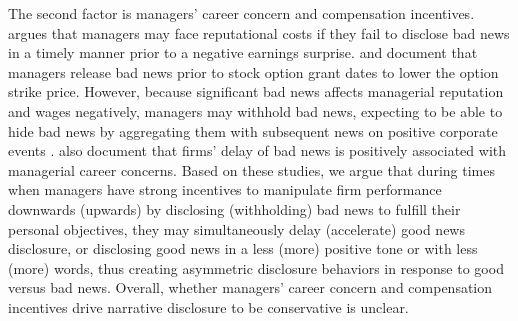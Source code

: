 \documentclass[letterpaper,11pt]{article}
\begin{document}
\begin{spacing}{1.5}
The second factor is managers' career concern and compensation incentives.  argues that managers may face reputational costs if they fail to disclose bad news in a timely manner prior to a negative earnings surprise.  and  document that managers release bad news prior to stock option grant dates to lower the option strike price. However, because significant bad news affects managerial reputation and wages negatively, managers may withhold bad news, expecting to be able to hide bad news by aggregating them with subsequent news on positive corporate events \cite{segalAreManagersStrategic2016, chapmanInformationOverloadDisclosure2019}.  also document that firms' delay of bad news is positively associated with managerial career concerns. Based on these studies, we argue that during times when managers have strong incentives to manipulate firm performance downwards (upwards) by disclosing (withholding) bad news to fulfill their personal objectives, they may simultaneously delay (accelerate) good news disclosure, or disclosing good news in a less (more) positive tone or with less (more) words, thus creating asymmetric disclosure behaviors in response to good versus bad news. Overall, whether managers' career concern and compensation incentives drive narrative disclosure to be conservative is unclear.


\end{spacing}
\end{document}
